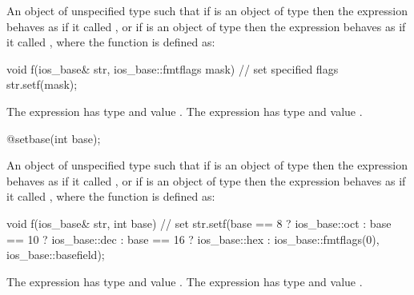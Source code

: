 \begin{itemdescr}
\pnum
\returns
An object of unspecified type such that if
is an object of type
then the expression
behaves as if it called
,
or if
is an object of type
then the expression
behaves as if it called
, where the function  is defined as:
%

\begin{codeblock}
void f(ios_base& str, ios_base::fmtflags mask) {
  // set specified flags
  str.setf(mask);
}
\end{codeblock}

The expression
has type
and value
.
The expression
has type
and value
.
\end{itemdescr}

%
\begin{itemdecl}
@\unspec@ setbase(int base);
\end{itemdecl}

\begin{itemdescr}
\pnum
\returns
An object of unspecified type such that if
is an object of type
then the expression
behaves as if it called
,
or if
is an object of type
then the expression
behaves as if it called
, where the function  is defined as:

\begin{codeblock}
void f(ios_base& str, int base) {
  // set 
  str.setf(base ==  8 ? ios_base::oct :
      base == 10 ? ios_base::dec :
      base == 16 ? ios_base::hex :
      ios_base::fmtflags(0), ios_base::basefield);
}
\end{codeblock}

The expression
has type
and value
.
The expression
has type
and value
.
\end{itemdescr}

